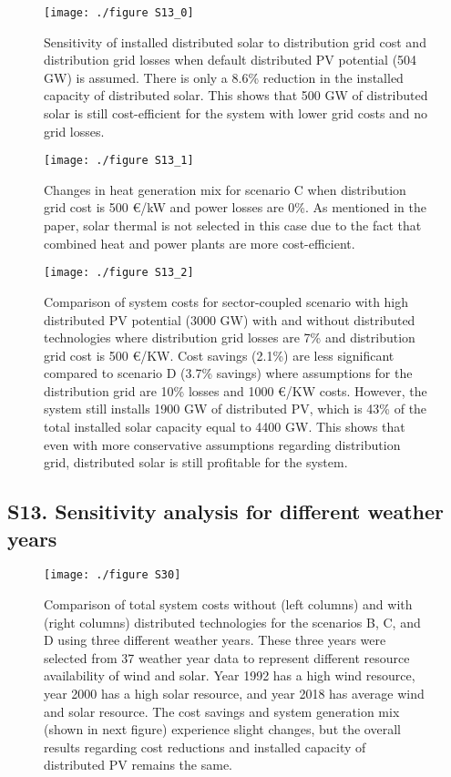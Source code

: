 	\begin{figure}[H]
		\renewcommand*{\thefigure}{S\arabic{figure}}
		\texttt{[image: ./figure S13\_0]}
		\caption{Sensitivity of installed distributed solar to distribution grid cost and distribution grid losses when default distributed PV potential (504 GW) is assumed. There is only a 8.6\% reduction in the installed capacity of distributed solar. This shows that 500 GW of distributed solar is still cost-efficient for the system with lower grid costs and no grid losses.  }
	\end{figure}
	
	\begin{figure}[H]
		\renewcommand*{\thefigure}{S\arabic{figure}}
		\texttt{[image: ./figure S13\_1]}
		\caption{Changes in heat generation mix for scenario C when distribution grid cost is 500 €/kW and power losses are 0\%. As mentioned in the paper, solar thermal is not selected in this case due to the fact that combined heat and power plants are more cost-efficient. }
	\end{figure}
	
	\begin{figure}[H]
		\renewcommand*{\thefigure}{S\arabic{figure}}
		\texttt{[image: ./figure S13\_2]}
		\caption{Comparison of system costs for sector-coupled scenario with high distributed PV potential (3000 GW) with and without distributed technologies where distribution grid losses are 7\% and distribution grid cost is 500 €/KW. Cost savings (2.1\%) are less significant compared to scenario D (3.7\% savings) where assumptions for the distribution grid are 10\% losses and 1000 €/KW costs. However, the system still installs 1900 GW of distributed PV, which is 43\% of the total installed solar capacity equal to 4400 GW. This shows that even with more conservative assumptions regarding distribution grid, distributed solar is still profitable for the system. }
	\end{figure}
	
	\subsection*{S13. Sensitivity analysis for different weather years}
	
	\begin{figure}[H]
		\renewcommand*{\thefigure}{S\arabic{figure}}
		\texttt{[image: ./figure S30]}
		\caption{Comparison of total system costs without (left columns) and with (right columns) distributed technologies for the scenarios B, C, and D using three different weather years. These three years were selected from 37 weather year data to represent different resource availability of wind and solar. Year 1992 has a high wind resource, year 2000 has a high solar resource, and year 2018 has average wind and solar resource. The cost savings and system generation mix (shown in next figure) experience slight changes, but the overall results regarding cost reductions and installed capacity of distributed PV remains the same. }
	\end{figure}
	
